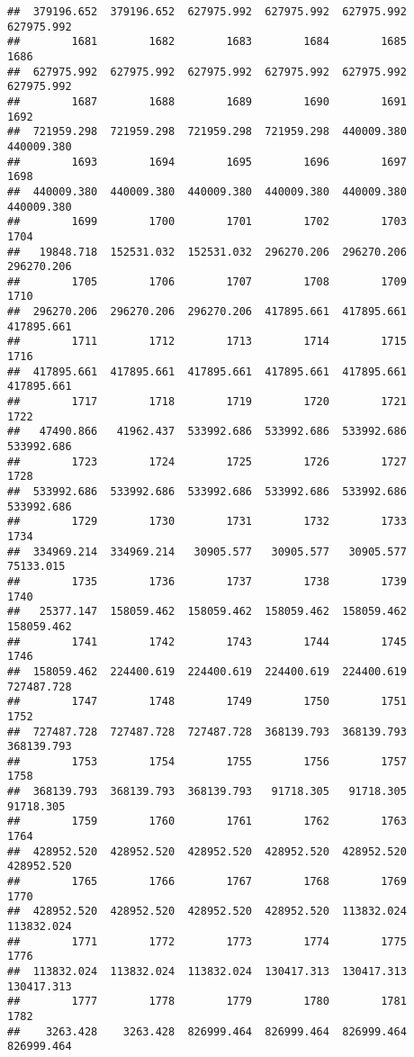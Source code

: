 \documentclass[
]{book}
\begin{document}
\begin{verbatim}
##  379196.652  379196.652  627975.992  627975.992  627975.992  627975.992 
##        1681        1682        1683        1684        1685        1686 
##  627975.992  627975.992  627975.992  627975.992  627975.992  627975.992 
##        1687        1688        1689        1690        1691        1692 
##  721959.298  721959.298  721959.298  721959.298  440009.380  440009.380 
##        1693        1694        1695        1696        1697        1698 
##  440009.380  440009.380  440009.380  440009.380  440009.380  440009.380 
##        1699        1700        1701        1702        1703        1704 
##   19848.718  152531.032  152531.032  296270.206  296270.206  296270.206 
##        1705        1706        1707        1708        1709        1710 
##  296270.206  296270.206  296270.206  417895.661  417895.661  417895.661 
##        1711        1712        1713        1714        1715        1716 
##  417895.661  417895.661  417895.661  417895.661  417895.661  417895.661 
##        1717        1718        1719        1720        1721        1722 
##   47490.866   41962.437  533992.686  533992.686  533992.686  533992.686 
##        1723        1724        1725        1726        1727        1728 
##  533992.686  533992.686  533992.686  533992.686  533992.686  533992.686 
##        1729        1730        1731        1732        1733        1734 
##  334969.214  334969.214   30905.577   30905.577   30905.577   75133.015 
##        1735        1736        1737        1738        1739        1740 
##   25377.147  158059.462  158059.462  158059.462  158059.462  158059.462 
##        1741        1742        1743        1744        1745        1746 
##  158059.462  224400.619  224400.619  224400.619  224400.619  727487.728 
##        1747        1748        1749        1750        1751        1752 
##  727487.728  727487.728  727487.728  368139.793  368139.793  368139.793 
##        1753        1754        1755        1756        1757        1758 
##  368139.793  368139.793  368139.793   91718.305   91718.305   91718.305 
##        1759        1760        1761        1762        1763        1764 
##  428952.520  428952.520  428952.520  428952.520  428952.520  428952.520 
##        1765        1766        1767        1768        1769        1770 
##  428952.520  428952.520  428952.520  428952.520  113832.024  113832.024 
##        1771        1772        1773        1774        1775        1776 
##  113832.024  113832.024  113832.024  130417.313  130417.313  130417.313 
##        1777        1778        1779        1780        1781        1782 
##    3263.428    3263.428  826999.464  826999.464  826999.464  826999.464 

\end{verbatim}
\end{document}
